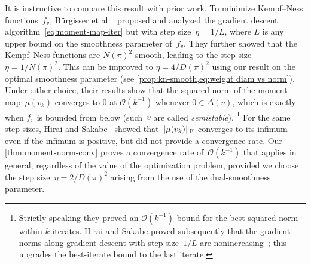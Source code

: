 \documentclass[11pt,letterpaper]{article}
\numberwithin{equation}{section}
\DeclarePairedDelimiter\norm{\lVert}{\rVert}
\begin{document}
It is instructive to compare this result with prior work.
To minimize Kempf--Ness functions~$f_v$, B\"{u}rgisser et al.~\cite{BFGOWW2019} proposed and analyzed the gradient descent algorithm~\eqref{eq:moment-map-iter} but with step size~$\eta=1/L$, where $L$ is any upper bound on the smoothness parameter of~$f_v$.
They further showed that the Kempf--Ness functions are $N(\pi)^2$-smooth, leading to the step size~$\eta=1/N(\pi)^2$.
This can be improved to $\eta = 4/D(\pi)^2$ using our result on the optimal smoothness parameter (see \cref{prop:kn-smooth,eq:weight diam vs norm}).
Under either choice, their results show that the squared norm of the moment map~$\mu(v_k)$ converges to $0$ at $\mathcal{O}(k^{-1})$ whenever $0 \in \Delta(v)$, which is exactly when $f_v$ is bounded from below (such~$v$ are called \emph{semistable}).%
\footnote{Strictly speaking they proved an $\mathcal{O}(k^{-1})$ bound for the best squared norm within $k$ iterates.
Hirai and Sakabe proved subsequently that the gradient norms along gradient descent with step size~$1/L$ are nonincreasing~\cite[Lem.~3.8~(2)]{HiraiSakabe2024}; this upgrades the best-iterate bound to the last iterate.}
For the same step sizes, Hirai and Sakabe~\cite{HiraiSakabe2024} showed that $\norm{\mu(v_k)}_{\mathrm F}$ converges to its infimum even if the infimum is positive, but did not provide a convergence rate.
Our \cref{thm:moment-norm-conv} proves a convergence rate of~$\mathcal{O}(k^{-1})$ that applies in general, regardless of the value of the optimization problem, provided we choose the step size~$\eta=2/D(\pi)^2$ arising from the use of the dual-smoothness parameter.
\end{document}
